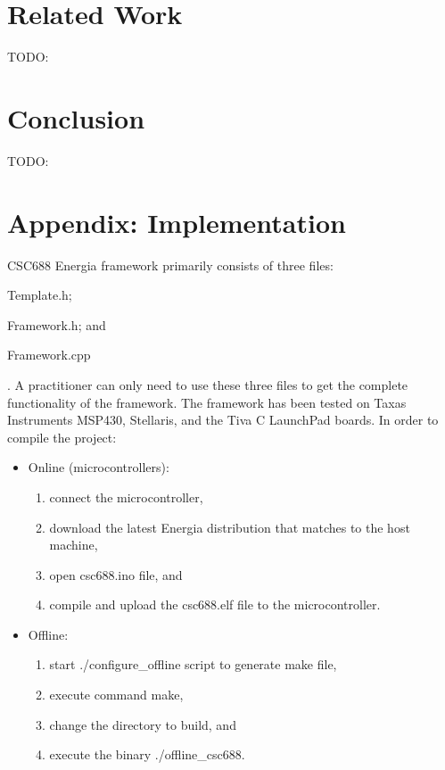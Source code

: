 \documentclass{llncs}
\begin{document}
\begin{sloppy}
\section{Related Work}
TODO:

\section{Conclusion}
TODO:




\newpage
\section*{Appendix: Implementation}
\label{appendix:Implementation}
CSC688 Energia framework primarily consists of three files: \begin{inparaenum}[(1)] \item
\label{fmw:A} {\sf Template.h}; \item \label{fmw:B} {\sf Framework.h}; and \item \label{fmw:C} {\sf
Framework.cpp}\end{inparaenum}. A practitioner can only need to use these three files to get the
complete functionality of the framework. The framework has been tested on Taxas Instruments MSP430,
Stellaris, and the Tiva C LaunchPad boards. In order to compile the project:

\begin{itemize}
 \item Online (microcontrollers):
\begin{enumerate}
\item connect the microcontroller,
\item download the latest Energia distribution that matches to the host machine,
\item open {\sf csc688.ino} file, and 
\item compile and upload the {\sf csc688.elf} file to the microcontroller.
\end{enumerate}

\item Offline:
\begin{enumerate}
\item start {\sf ./configure\_offline} script to generate make file,
\item execute command {\sf make},
\item change the directory to {\sf build}, and 
\item execute the binary {./offline\_csc688}.
\end{enumerate}


\end{itemize}
\end{sloppy}
\end{document}
